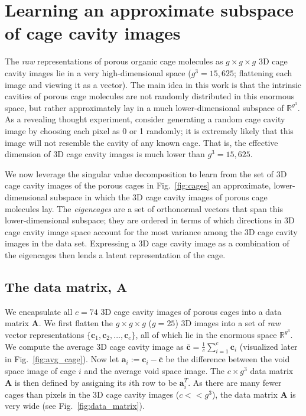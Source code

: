 \documentclass[journal=jacsat,manuscript=article,layout=traditional]{achemso}
\begin{document}
\section{Learning an approximate subspace of cage cavity images} 

The \emph{raw} representations of porous organic cage molecules as $g\times g \times g$ 3D cage cavity images lie in a very high-dimensional space ($g^3=15,625$; flattening each image and viewing it as a vector). The main idea in this work is that the intrinsic cavities of porous cage molecules are not randomly distributed in this enormous space, but rather approximately lay in a much lower-dimensional subspace of $\mathbb{R}^{g^3}$. As a revealing thought experiment, consider generating a random cage cavity image by choosing each pixel as 0 or 1 randomly; it is extremely likely that this image will not resemble the cavity of any known cage. That is, the effective dimension of 3D cage cavity images is much lower than $g^3=15,625$. 

We now leverage the singular value decomposition \cite{muller2004singular,kalman1996singularly,strang1993introduction} to learn from the set of 3D cage cavity images of the porous cages in Fig.~\ref{fig:cages} an approximate, lower-dimensional subspace in which the 3D cage cavity images of porous cage molecules lay.
The \emph{eigencages} are a set of orthonormal vectors that span this lower-dimensional subspace; they are ordered in terms of which directions in 3D cage cavity image space account for the most variance among the 3D cage cavity images in the data set. Expressing a 3D cage cavity image as a combination of the eigencages then lends a latent representation of the cage.

\subsection{The data matrix, $\mathbf{A}$} We encapsulate all $c=74$ 3D cage cavity images of porous cages into a data matrix $\mathbf{A}$. We first flatten the $g\times g\times g$ ($g=25$) 3D images into a set of \emph{raw} vector representations $\{\mathbf{c}_1, \mathbf{c}_2, ..., \mathbf{c}_c\}$, all of which lie in the enormous space $\mathbb{R}^{g^3}$. 
We compute the average 3D cage cavity image as $\bar{\mathbf{c}}=\frac{1}{c}\sum_{i=1}^c  \mathbf{c}_i$ (visualized later in Fig.~\ref{fig:avg_cage}). Now let $\mathbf{a}_i:=\mathbf{c}_i-\bar{\mathbf{c}}$ be the difference between the void space image of cage $i$ and the average void space image. The $c \times g^3$ data matrix $\mathbf{A}$ is then defined by assigning its $i$th row to be $\mathbf{a}_i^T$. As there are many fewer cages than pixels in the 3D cage cavity images ($c<<g^3$), the data matrix $\mathbf{A}$ is very wide (see Fig.~\ref{fig:data_matrix}).
\end{document}
